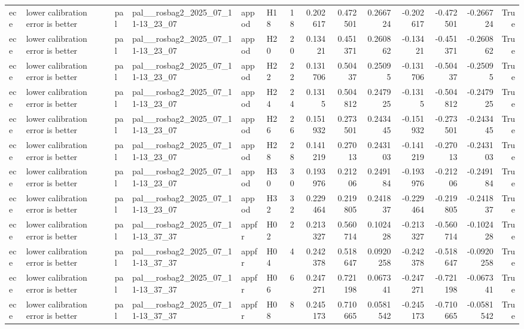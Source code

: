 \begin{longtable}{llllllrrrrrrrr}
ece & lower calibration error is better & pal & pal\_\_rosbag2\_2025\_07\_11-13\_23\_07 & appod & H18 & 18 & 0.202617 & 0.472501 & 0.266724 & -0.202617 & -0.472501 & -0.266724 & True \\
ece & lower calibration error is better & pal & pal\_\_rosbag2\_2025\_07\_11-13\_23\_07 & appod & H20 & 20 & 0.13421 & 0.451371 & 0.260862 & -0.13421 & -0.451371 & -0.260862 & True \\
ece & lower calibration error is better & pal & pal\_\_rosbag2\_2025\_07\_11-13\_23\_07 & appod & H22 & 22 & 0.131706 & 0.50437 & 0.25095 & -0.131706 & -0.50437 & -0.25095 & True \\
ece & lower calibration error is better & pal & pal\_\_rosbag2\_2025\_07\_11-13\_23\_07 & appod & H24 & 24 & 0.1315 & 0.504812 & 0.247925 & -0.1315 & -0.504812 & -0.247925 & True \\
ece & lower calibration error is better & pal & pal\_\_rosbag2\_2025\_07\_11-13\_23\_07 & appod & H26 & 26 & 0.151932 & 0.273501 & 0.243445 & -0.151932 & -0.273501 & -0.243445 & True \\
ece & lower calibration error is better & pal & pal\_\_rosbag2\_2025\_07\_11-13\_23\_07 & appod & H28 & 28 & 0.141219 & 0.27013 & 0.243103 & -0.141219 & -0.27013 & -0.243103 & True \\
ece & lower calibration error is better & pal & pal\_\_rosbag2\_2025\_07\_11-13\_23\_07 & appod & H30 & 30 & 0.193976 & 0.21206 & 0.249184 & -0.193976 & -0.21206 & -0.249184 & True \\
ece & lower calibration error is better & pal & pal\_\_rosbag2\_2025\_07\_11-13\_23\_07 & appod & H32 & 32 & 0.229464 & 0.219805 & 0.241837 & -0.229464 & -0.219805 & -0.241837 & True \\
ece & lower calibration error is better & pal & pal\_\_rosbag2\_2025\_07\_11-13\_37\_37 & appfr & H02 & 2 & 0.213327 & 0.560714 & 0.102428 & -0.213327 & -0.560714 & -0.102428 & True \\
ece & lower calibration error is better & pal & pal\_\_rosbag2\_2025\_07\_11-13\_37\_37 & appfr & H04 & 4 & 0.242378 & 0.518647 & 0.0920258 & -0.242378 & -0.518647 & -0.0920258 & True \\
ece & lower calibration error is better & pal & pal\_\_rosbag2\_2025\_07\_11-13\_37\_37 & appfr & H06 & 6 & 0.247271 & 0.721198 & 0.067341 & -0.247271 & -0.721198 & -0.067341 & True \\
ece & lower calibration error is better & pal & pal\_\_rosbag2\_2025\_07\_11-13\_37\_37 & appfr & H08 & 8 & 0.245173 & 0.710665 & 0.0581542 & -0.245173 & -0.710665 & -0.0581542 & True \\

\end{longtable}
